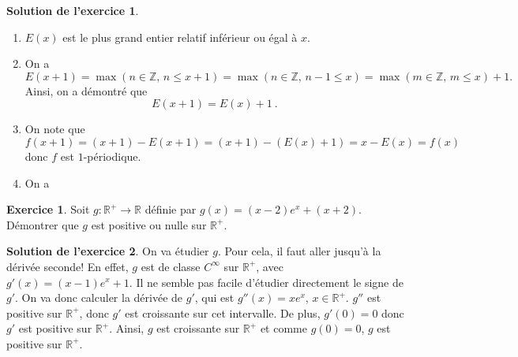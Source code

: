 \documentclass[a4paper, 11pt,openany]{article}%
\theoremstyle{plain}
\theoremstyle{definition}
\newtheorem{exo}{Exercice}
\newtheorem{sol}{Solution de l'exercice}
\theoremstyle{remark}
\newcommand{\R}{\mathbb{R}}
\newcommand{\Z}{\mathbb{Z}}
\begin{document}
\begin{sol}
	\begin{enumerate}
		\item $E(x)$ est le plus grand entier relatif inférieur ou égal à $x$.
		\item On a 
		\[ E(x+1) = \max ( n \in \Z, \, n \leqslant x+1) = \max ( n \in \Z, \, n-1 \leqslant x) = \max ( m \in \Z, \, m \leqslant x) +1.\]
		Ainsi, on a démontré que
			\[
			E(x+1)	= E(x) + 1 \ .
		\]
		\item On note que
		\[
			f(x+1) = (x+1) - E(x+1)	= (x+1) - ( E(x)+1) =x - E(x) = f(x)\]
		donc $f$ est $1$-périodique.
		\item On a
		\begin{center}
\end{center}
	\end{enumerate}
\end{sol}




\begin{exo}
Soit $g:\R^+ \to \R$ définie par $g(x)=(x-2)e^x+(x+2)$. Démontrer que $g$ est positive ou nulle sur $\R^+$.
\end{exo}

\begin{sol}
On va étudier $g$. Pour cela, il faut aller jusqu'à la dérivée seconde! En effet, $g$ est de classe $C^{\infty}$ sur $\R^+$, avec $g'(x)=(x-1)e^x+1$. Il ne semble pas facile d'étudier directement le signe de $g'$. On va donc calculer la dérivée de $g'$, qui est $g''(x)=xe^x$, $x \in \R^+$. $g''$ est positive sur $\R^+$, donc $g'$ est croissante sur cet intervalle. De plus, $g'(0)=0$ donc $g'$ est positive sur $\R^+$. Ainsi, $g$ est croissante sur $\R^+$ et comme $g(0)=0$, $g$ est positive sur $\R^+$.
\end{sol}
%
\end{document}
